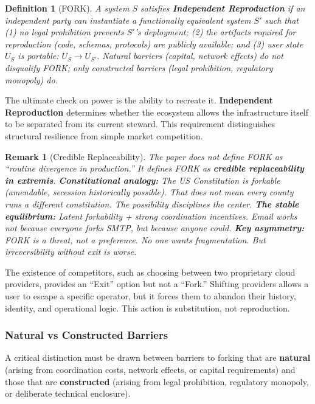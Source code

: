 \documentclass{article}
\newtheorem{definition}{Definition}
\newtheorem{remark}{Remark}
\begin{document}
\begin{definition}[FORK]
\label{def:fork}
A system $S$ satisfies \textbf{Independent Reproduction} if an independent party can instantiate a functionally equivalent system $S'$ such that (1) no legal prohibition prevents $S'$'s deployment; (2) the artifacts required for reproduction (code, schemas, protocols) are publicly available; and (3) user state $U_S$ is portable: $U_S \to U_{S'}$. Natural barriers (capital, network effects) do not disqualify FORK; only constructed barriers (legal prohibition, regulatory monopoly) do.
\end{definition}

The ultimate check on power is the ability to recreate it. \textbf{Independent Reproduction} determines whether the ecosystem allows the infrastructure itself to be separated from its current steward. This requirement distinguishes structural resilience from simple market competition.

\begin{remark}[Credible Replaceability]
The paper does not define FORK as ``routine divergence in production.'' It defines FORK as \textbf{credible replaceability in extremis}. \textbf{Constitutional analogy:} The US Constitution is forkable (amendable, secession historically possible). That does not mean every county runs a different constitution. The \textit{possibility} disciplines the center. \textbf{The stable equilibrium:} Latent forkability + strong coordination incentives. Email works not because everyone forks SMTP, but because anyone \textit{could}. \textbf{Key asymmetry:} FORK is a threat, not a preference. No one wants fragmentation. But irreversibility without exit is worse.
\end{remark}

The existence of competitors, such as choosing between two proprietary cloud providers, provides an ``Exit'' option but not a ``Fork.'' Shifting providers allows a user to escape a specific operator, but it forces them to abandon their history, identity, and operational logic. This action is substitution, not reproduction.

\subsubsection{Natural vs Constructed Barriers}

A critical distinction must be drawn between barriers to forking that are \textbf{natural} (arising from coordination costs, network effects, or capital requirements) and those that are \textbf{constructed} (arising from legal prohibition, regulatory monopoly, or deliberate technical enclosure).
\end{document}
